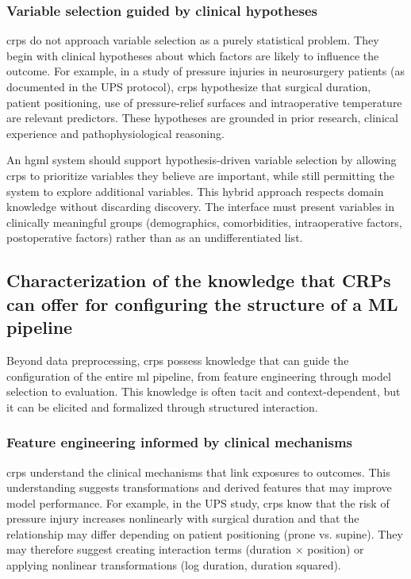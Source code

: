 \documentclass[twoside,final]{Contexto}
\begin{document}
\subsubsection{Variable selection guided by clinical hypotheses}

\glspl{crp} do not approach variable selection as a purely statistical problem. They begin with clinical hypotheses about which factors are likely to influence the outcome. For example, in a study of pressure injuries in neurosurgery patients (as documented in the UPS protocol), \glspl{crp} hypothesize that surgical duration, patient positioning, use of pressure-relief surfaces and intraoperative temperature are relevant predictors. These hypotheses are grounded in prior research, clinical experience and pathophysiological reasoning.

An \gls{hgml} system should support hypothesis-driven variable selection by allowing \glspl{crp} to prioritize variables they believe are important, while still permitting the system to explore additional variables. This hybrid approach respects domain knowledge without discarding discovery. The interface must present variables in clinically meaningful groups (demographics, comorbidities, intraoperative factors, postoperative factors) rather than as an undifferentiated list.


\subsection{Characterization of the knowledge that CRPs can offer for configuring the structure of a ML pipeline}

Beyond data preprocessing, \glspl{crp} possess knowledge that can guide the configuration of the entire \gls{ml} pipeline, from feature engineering through model selection to evaluation. This knowledge is often tacit and context-dependent, but it can be elicited and formalized through structured interaction.

\subsubsection{Feature engineering informed by clinical mechanisms}

\glspl{crp} understand the clinical mechanisms that link exposures to outcomes. This understanding suggests transformations and derived features that may improve model performance. For example, in the UPS study, \glspl{crp} know that the risk of pressure injury increases nonlinearly with surgical duration and that the relationship may differ depending on patient positioning (prone vs. supine). They may therefore suggest creating interaction terms (duration × position) or applying nonlinear transformations (log duration, duration squared).
\end{document}
